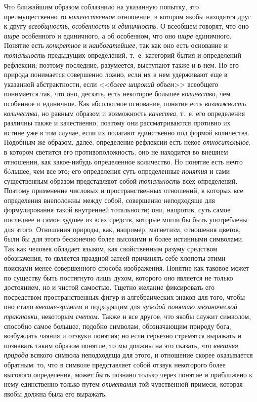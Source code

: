 {Что ближайшим образом соблазнило на указанную попытку, это
преимущественно то {\em количественное}
отношение, в котором якобы находятся друг к другу
{\em всеобщность},
{\em особенность} и
{\em единичность}. О
всеобщем говорят, что оно {\em шире}
особенного и единичного, а об особенном, что оно
{\em шире} единичного.
Понятие есть {\em конкретное}
и {\em наибогатейшее},
так как оно есть основание и
{\em тотальность}
предыдущих определений, т.~е. категорий бытия и определений
рефлексии; поэтому последние, разумеется, выступают также и в нем. Но его
природа понимается совершенно ложно, если их в нем удерживают еще в
указанной абстрактности, если
<<{\em более широкий объем}>>
всеобщего понимается так, что оно, дескать, есть некоторое
большее {\em количество},
чем особенное и единичное. Как абсолютное основание, понятие
есть {\em возможность количества},
но равным образом и возможность
{\em качества}, т.~е. его
определения различны также и качественно; поэтому они рассматриваются
противно их истине уже в том случае, если их полагают единственно под
формой количества. Подобным же образом, далее, определение рефлексии есть
некое {\em относительное},
в котором светится его противоположность; оно не находится во
внешнем отношении, как какое-нибудь определенное количество. Но понятие
есть нечто бóльшее, чем все это; его определения суть определенные
{\em понятия} и сами
существенным образом представляют собой
{\em тотальность} всех
определений. Поэтому применение числовых и пространственных отношений, в
которых все определения внеположны между собой, совершенно неподходяще для
формулирования такой внутренней тотальности; они, напротив, суть самое
последнее и самое худшее из всех средств, которые могли бы быть употреблены
для этого. Отношения природы, как, например, магнетизм, отношения цветов,
были бы для этого бесконечно более высокими и более истинными символами.
Так как человек обладает языком, как свойственным разуму средством
обозначения, то является праздной затеей причинять себе
хлопоты этими поисками менее совершенного способа изображения. Понятие как
таковое может по существу быть постигнуто лишь духом, которого оно является
не только достоянием, но и чистой самостью. Тщетно желание фиксировать его
посредством пространственных фигур и алгебраических знаков для того, чтобы
оно стало {\em внешне-зримым
}и подходящим для
{\em чуждой понятию механической
трактовки}, некоторым
{\em счетом}. Также и все
другое, что якобы служит символом, способно самое большее, подобно
символам, обозначающим природу бога, возбуждать чаяния и отзвуки понятия;
но если серьезно стремятся выражать и познавать таким образом понятие, то
мы должны на это сказать, что
{\em внешняя природа}
всякого символа неподходяща для этого, и отношение скорее
оказывается обратным: то, что в символе представляет собой отзвук
некоторого более высокого определения, может быть познано только через
понятие и приближено к нему единственно только путем
{\em отметания} той
чувственной примеси, которая якобы должна была его выражать.

}
